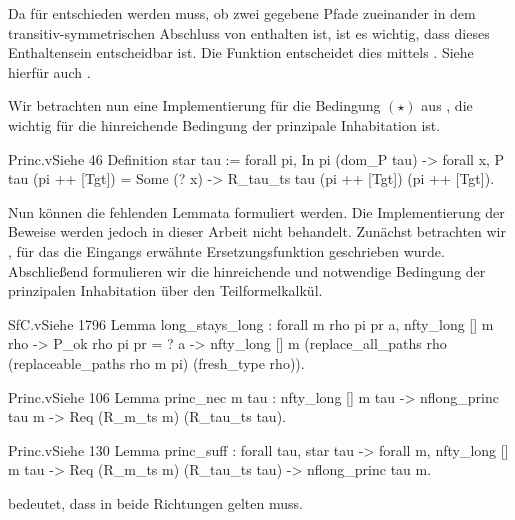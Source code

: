 Da für  entschieden werden muss, ob zwei gegebene Pfade zueinander in dem transitiv-symmetrischen Abschluss von  enthalten ist, ist es wichtig, dass dieses Enthaltensein entscheidbar ist. Die Funktion  entscheidet dies mittels . Siehe hierfür auch .

Wir betrachten nun eine Implementierung für die Bedingung $(\star)$ aus , die wichtig für die hinreichende Bedingung der prinzipale Inhabitation ist.
\begin{code}[star]{Princ.v}{Siehe }{46}
Definition star tau := forall pi, In pi (dom_P tau) -> 
    forall x, P tau (pi ++ [Tgt]) = Some (? x) ->
      R_tau_ts tau (pi ++ [Tgt]) (pi ++ [Tgt]).
\end{code}

Nun können die fehlenden Lemmata formuliert werden. Die Implementierung der Beweise werden jedoch in dieser Arbeit nicht behandelt. Zunächst betrachten wir , für das die Eingangs erwähnte Ersetzungsfunktion  geschrieben wurde. Abschließend formulieren wir die hinreichende und notwendige Bedingung der prinzipalen Inhabitation über den Teilformelkalkül.
    
\begin{code}{SfC.v}{Siehe }{1796}
Lemma long_stays_long : forall m rho pi pr a, nfty_long [] m rho -> 
    P_ok rho pi pr = ? a ->
      nfty_long [] m 
        (replace_all_paths rho (replaceable_paths rho m pi) 
          (fresh_type rho)).
\end{code}

\begin{code}{Princ.v}{Siehe }{106}
Lemma princ_nec {m tau} : nfty_long [] m tau -> 
    nflong_princ tau m -> Req (R_m_ts m) (R_tau_ts tau).
\end{code}
\begin{code}{Princ.v}{Siehe }{130}
Lemma princ_suff : forall tau, star tau -> forall m, nfty_long [] m tau ->
    Req (R_m_ts m) (R_tau_ts tau) -> nflong_princ tau m.
\end{code}
\begin{remark}
     bedeutet, dass  in beide Richtungen gelten muss.
\end{remark}
